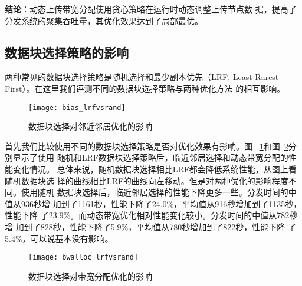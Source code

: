 \textbf{结论}：动态上传带宽分配使用贪心策略在运行时动态调整上传节点数
据，提高了分发系统的聚集吞吐量，其优化效果达到了局部最优。

%


\subsection{数据块选择策略的影响}

两种常见的数据块选择策略是随机选择和最少副本优先（LRF,
Least-Rarest-First）。在这里我们评测不同的数据块选择策略与两种优化方法
的相互影响。

\begin{figure}[htbp]
  \centering
  \begin{minipage}{0.6\linewidth}
    \centering
    \texttt{[image: bias\_lrfvsrand]}
    \caption{数据块选择对邻近邻居优化的影响}
    \label{fig:bias_lrfvsrand}
  \end{minipage}
\end{figure}

首先我们比较使用不同的数据块选择策略是否对优化效果有影响。图~
\ref{fig:bias_lrfvsrand}和图~\ref{fig:bwalloc_lrfvsrand}分别显示了使用
随机和LRF数据块选择策略后，临近邻居选择和动态带宽分配的性能变化情况。
总体来说，随机数据块选择相比LRF都会降低系统性能，从图上看随机数据块选
择的曲线相比LRF的曲线向左移动。但是对两种优化的影响程度不同。使用随机
数据块选择后，临近邻居选择的性能下降更多一些。分发时间的中值从936秒增
加到了1161秒，性能下降了24.0\%，平均值从916秒增加到了1135秒，性能下降
了23.9\%。而动态带宽优化相对性能变化较小。分发时间的中值从782秒增
加到了828秒，性能下降了5.9\%，平均值从780秒增加到了822秒，性能下降
了5.4\%，可以说基本没有影响。

\begin{figure}[htbp]
  \centering
  \begin{minipage}{0.6\linewidth}
    \centering
    \texttt{[image: bwalloc\_lrfvsrand]}
    \caption{数据块选择对带宽分配优化的影响}
    \label{fig:bwalloc_lrfvsrand}
  \end{minipage}
\end{figure}

